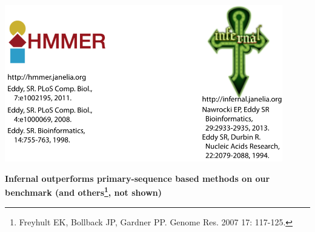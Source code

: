 \documentclass[landscape]{slides}
\begin{document}
\begin{slide}
\begin{center}
\hspace{1.8in}\includegraphics[height=2.7in]{figs/hmmer-infernal-refs-2018}

\end{center}

\vfill

\end{slide}
%
\begin{slide}
\begin{center}

\textbf{Infernal outperforms primary-sequence based methods on our
  benchmark (and others\footnote{Freyhult EK, Bollback JP, Gardner
    PP. Genome Res. 2007 17: 117-125.}, not shown)}

\end{center}
\medskip


\vfill 
\end{slide}
\end{document}
